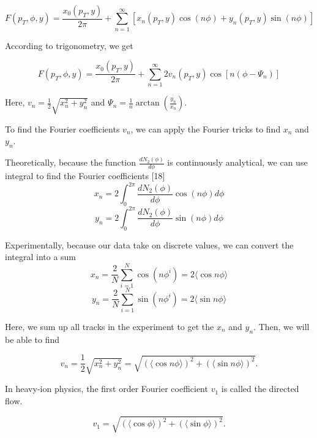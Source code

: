 \begin{equation}
F(p_T,\phi,y) = \frac{x_0(p_T,y)}{2\pi}  + \sum_{n=1}^{\infty}[x_n(p_T,y)\cos(n\phi)+y_n(p_T,y)\sin(n\phi)] 
\end{equation}

According to trigonometry, we get

\begin{equation}
F(p_T,\phi,y)  = \frac{x_0(p_T,y)}{2\pi} + \sum_{n=1}^{\infty}2v_n(p_T,y)\cos[n(\phi - \Psi_{n})]
\end{equation}

Here, $v_n = \frac{1}{2} \sqrt{x_n^2 + y_n^2}$ and $\Psi_{n} =\frac{1}{n} \arctan(\frac{y_n}{x_n})$. 

To find the Fourier coefficients $v_n$, we can apply the Fourier tricks to find $x_n$ and $y_n$.


Theoretically, because the function $\frac{dN_2(\phi)}{d\phi}$ is continuously analytical, we can use integral to find the Fourier coefficients [18] 
\begin{equation}
x_n =2\int_{0}^{2\pi} \frac{dN_2(\phi)}{d\phi}\cos(n\phi)d\phi 
\end{equation}
\begin{equation}
y_n =2\int_{0}^{2\pi} \frac{dN_2(\phi)}{d\phi}\sin(n\phi)d\phi 
\end{equation}

Experimentally, because our data take on discrete values, we can convert the integral into a sum 
\begin{equation}
x_n =\frac{2}{N}\sum_{i=1}^{N} \cos(n\phi^i) = 2\langle \cos n\phi \rangle
\end{equation}
\begin{equation}
y_n =\frac{2}{N}\sum_{i=1}^{N} \sin(n\phi^i) = 2\langle \sin n\phi \rangle
\end{equation}

Here, we sum up all tracks in the experiment to get the $x_n$ and $y_n$. Then, we will be able to find 

\begin{equation}
v_n = \frac{1}{2} \sqrt{x_n^2 + y_n^2} = \sqrt{(\langle \cos n\phi \rangle)^2+(\langle \sin n\phi \rangle)^2}. 
\end{equation}




In heavy-ion physics, the first order Fourier coefficient $v_1$ is called the directed flow. 

\begin{equation}
v_1 =  \sqrt{(\langle \cos \phi \rangle)^2+(\langle \sin \phi \rangle)^2}. 
\end{equation}

